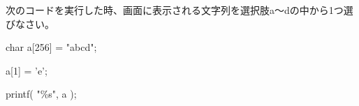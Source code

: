 次のコードを実行した時、画面に表示される文字列を選択肢a〜dの中から1つ選びなさい。\par
\noindent char a[256] = "abcd"; \par
\noindent a[1] = 'e'; \par
\noindent printf( "\%s", a ); \par
